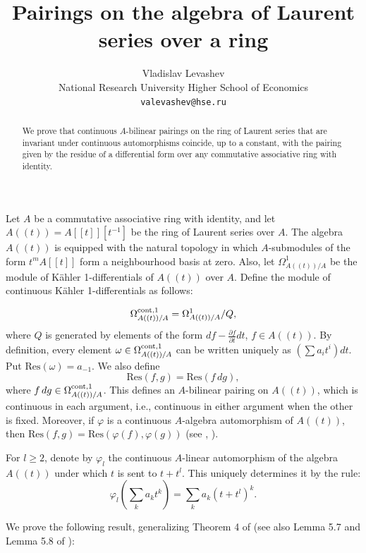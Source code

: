 \documentclass[11pt,a4paper]{article}
\title{Pairings on the algebra of Laurent series over a ring}
\author{Vladislav Levashev\\[0.5em]
  \small National Research University Higher School of Economics\\
  \small\texttt{valevashev@hse.ru}}
\date{}
\theoremstyle{plain}
\newcommand{\OmegaC}{\Omega^{\rm{cont}, 1}_{A((t))/A}}
\newcommand{\res}{\mathrm{Res}}
\begin{document}
\maketitle
\begin{abstract}
	We prove that continuous $A$-bilinear pairings on the ring of Laurent
	series that are invariant under continuous automorphisms coincide,
	up to a constant, with the pairing given by the residue of a
	differential form over any commutative associative ring with identity.
\end{abstract}

\begingroup
\renewcommand{\thefootnote}{}
\endgroup
\medskip

Let $A$ be a commutative associative ring with identity, and let
$A((t)) = A[[t]][t^{-1}]$ be the ring of Laurent series over $A$.
The algebra $A((t))$ is equipped with the natural topology in which $A$-submodules
of the form $t^{m}A[[t]]$ form a  neighbourhood basis at zero.
Also, let $\Omega^{1}_{A((t))/A}$ be the module of Kähler
1-differentials of $A((t))$ over $A$.
Define the module of continuous Kähler 1-differentials as follows:

$$\OmegaC = \Omega^{1}_{A((t))/A}/Q,$$
where $Q$ is generated by elements of the form
$df - \frac{\partial f}{\partial t}dt$, $f\in A((t))$.
By definition, every element
$\omega\in \OmegaC$ can be written uniquely
as $(\sum a_{i} t^{i}) dt$.
Put $\res(\omega) = a_{-1}$. We also define
$$\res(f, g) = \res(f\,dg),$$
where $f\,dg \in \OmegaC$. This defines
an $A$-bilinear pairing on $A((t))$, which is continuous in each argument, i.e., continuous in either argument when the other is fixed. Moreover, if $\varphi$ is a continuous $A$-algebra
automorphism of $A((t))$, then
$\res(f,g) = \res(\varphi(f), \varphi(g))$
(see \cite[Ch.~II, §~11]{Ser68},
\cite[Proposition 5.3]{GorOsi16}).


For $l \geq 2$, denote by $\varphi_l$ the continuous $A$-linear
automorphism of the algebra $A((t))$ under which $t$ is sent
to $t + t^l$. This uniquely determines it by the rule:
$$\varphi_l(\sum_{k} a_{k} t^{k}) = \sum_{k} a_k (t + t^l)^{k}.$$

We prove the following result, generalizing Theorem 4
of \cite{Lev26} (see also Lemma 5.7 and Lemma 5.8
of \cite{OsiZhu16}):
\end{document}

